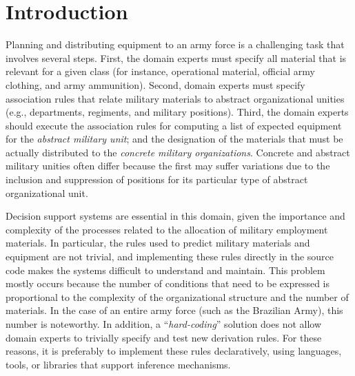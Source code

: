 \documentclass[AMA,STIX1COL,hidelinks]{WileyNJD-v2}
\begin{document}



\maketitle




\section{Introduction}\label{sec:Introduction}

Planning and distributing equipment to an army force is a
  challenging task that involves several steps. First, the
  domain experts must specify all material that is relevant
  for a given class (for instance, operational material, official army clothing,
  and army ammunition). Second, domain experts must specify association 
rules that relate military materials to abstract 
organizational unities (e.g., departments, regiments,
and military positions). Third, the domain experts should 
execute the association rules for computing a list of expected
equipment for the \emph{abstract military unit}; and the
designation of the materials that must be
actually distributed to the \emph{concrete military organizations}. Concrete and
abstract military unities often differ because the first may suffer
variations due to the inclusion and suppression of positions
for its particular type of abstract organizational unit.

Decision support systems are essential in this domain, given the importance and complexity of the processes related to the allocation of military employment materials. In particular, the rules used to predict military materials and equipment are not trivial, and implementing these rules directly in the source code makes the systems difficult to understand and maintain. This problem mostly occurs because the number of conditions that need to be expressed is proportional to the complexity of the organizational structure and the number of materials. In the case of an entire army force (such as the Brazilian Army), this number is noteworthy. In addition, a ``\emph{hard-coding}'' solution does not allow domain experts to trivially specify and test new derivation rules. For these reasons, it is preferably to implement these rules declaratively, using languages, tools, or libraries that
support inference mechanisms.
\end{document}
